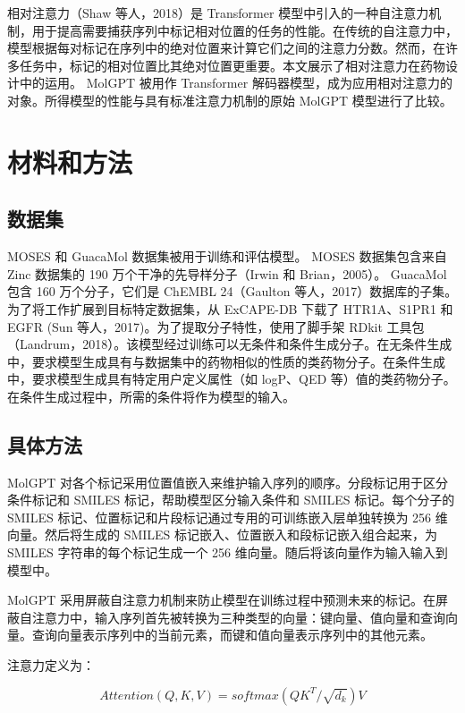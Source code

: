 相对注意力（Shaw 等人，2018）是 Transformer 模型中引入的一种自注意力机制，用于提高需要捕获序列中标记相对位置的任务的性能。在传统的自注意力中，模型根据每对标记在序列中的绝对位置来计算它们之间的注意力分数。然而，在许多任务中，标记的相对位置比其绝对位置更重要。本文展示了相对注意力在药物设计中的运用。 MolGPT 被用作 Transformer 解码器模型，成为应用相对注意力的对象。所得模型的性能与具有标准注意力机制的原始 MolGPT 模型进行了比较。

\section{材料和方法}

\subsection{数据集}
MOSES 和 GuacaMol 数据集被用于训练和评估模型。 MOSES 数据集包含来自 Zinc 数据集的 190 万个干净的先导样分子（Irwin 和 Brian，2005）。 GuacaMol 包含 160 万个分子，它们是 ChEMBL 24（Gaulton 等人，2017）数据库的子集。为了将工作扩展到目标特定数据集，从 ExCAPE-DB 下载了 HTR1A、S1PR1 和 EGFR (Sun 等人，2017)。为了提取分子特性，使用了脚手架 RDkit 工具包（Landrum，2018）。该模型经过训练可以无条件和条件生成分子。在无条件生成中，要求模型生成具有与数据集中的药物相似的性质的类药物分子。在条件生成中，要求模型生成具有特定用户定义属性（如 logP、QED 等）值的类药物分子。在条件生成过程中，所需的条件将作为模型的输入。

\subsection{具体方法}

MolGPT 对各个标记采用位置值嵌入来维护输入序列的顺序。分段标记用于区分条件标记和 SMILES 标记，帮助模型区分输入条件和 SMILES 标记。每个分子的 SMILES 标记、位置标记和片段标记通过专用的可训练嵌入层单独转换为 256 维向量。然后将生成的 SMILES 标记嵌入、位置嵌入和段标记嵌入组合起来，为 SMILES 字符串的每个标记生成一个 256 维向量。随后将该向量作为输入输入到模型中。

MolGPT 采用屏蔽自注意力机制来防止模型在训练过程中预测未来的标记。在屏蔽自注意力中，输入序列首先被转换为三种类型的向量：键向量、值向量和查询向量。查询向量表示序列中的当前元素，而键和值向量表示序列中的其他元素。

注意力定义为：

\begin{equation}
  Attention(Q,K,V)=softmax({QK^T}/ {\sqrt{d_k}})V
\end{equation}

